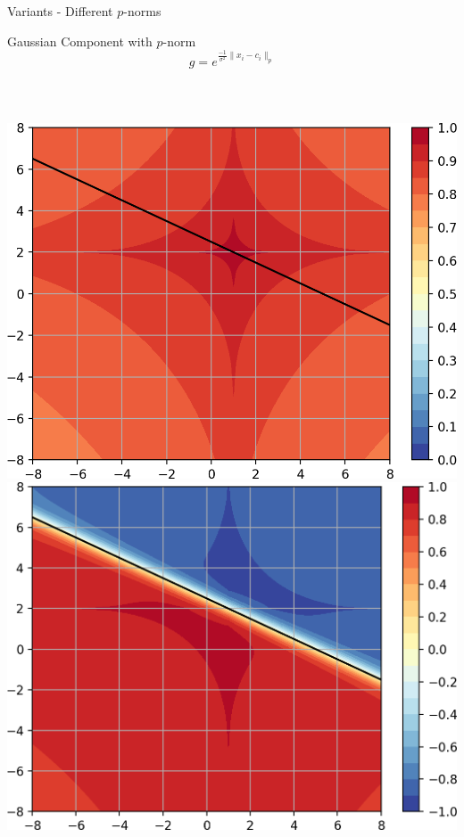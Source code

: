 \documentclass{beamer}
\begin{document}
\begin{frame}{Variants - Different $p$-norms}
    \begin{block}{Gaussian Component with $p$-norm}
        $$ g = e^{\frac{-1}{\sigma^2}\lVert x_i-c_i \lVert_p }$$
    \end{block} ~\\
    
    \begin{columns}
    \hspace{-0.2cm}
    \begin{column}{.27\textwidth}
            \includegraphics[width=\textwidth]{images/Variants-Norms/ord0.5_g-cropped.png}\\
            \includegraphics[width=\textwidth]{images/Variants-Norms/ord0.5-cropped.png}\\

\end{column}
\end{columns}
\end{frame}
\end{document}
